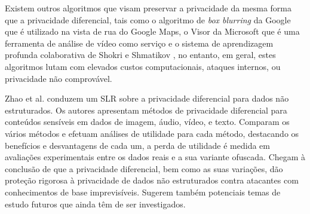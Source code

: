 \documentclass[conference]{IEEEtran}
\begin{document}

Existem outros algoritmos que visam preservar a privacidade da mesma forma
que a privacidade diferencial, tais como o algoritmo de \textit{box blurring}
da Google \cite{FromeLarge} que é utilizado na vista de rua do Google Maps,
o Visor da Microsoft \cite{poddar2020visor} que é uma ferramenta de análise
de vídeo como serviço e o sistema de aprendizagem profunda colaborativa de
Shokri e Shmatikov \cite{ShokriPrivacy}, no entanto, em geral, estes algoritmos
lutam com elevados custos computacionais, ataques internos, ou privacidade
não comprovável.


Zhao et al. \cite{ZhaoSurvey} conduzem um SLR sobre a privacidade diferencial
para dados não estruturados. Os autores apresentam métodos de privacidade
diferencial para conteúdos sensíveis em dados de imagem, áudio, vídeo, e texto.
Comparam os vários métodos e efetuam análises de utilidade para cada método,
destacando os benefícios e desvantagens de cada um, a perda de utilidade é
medida em avaliações experimentais entre os dados reais e a sua variante ofuscada.
Chegam à conclusão de que a privacidade diferencial, bem como as suas variações,
dão proteção rigorosa à privacidade de dados não estruturados contra atacantes
com conhecimentos de base imprevisíveis. Sugerem também potenciais temas de
estudo futuros que ainda têm de ser investigados.

\end{document}
